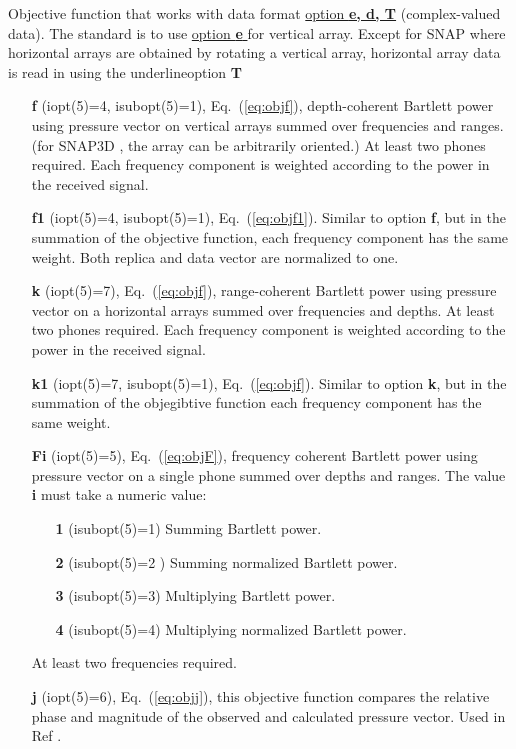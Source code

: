 \documentclass{saclantc}
\begin{document}
Objective function that works with data format \underline{option {\bf
e, d, T}}
(complex-valued data). The standard is to use \underline{option {\bf e
}} for vertical array. 
Except for {\sf SNAP} where horizontal arrays are obtained by
rotating a vertical array, horizontal array data is read in using the
underline{option {\bf T }}
\vspace{-0.6cm}
\begin{itemize}
    \item[{\bf f}] (iopt(5)=4, isubopt(5)=1), Eq.\ (\ref{eq:objf}), depth-coherent Bartlett power
 using pressure vector on vertical  arrays summed over frequencies and ranges.
(for {\sf SNAP3D }, the array can be arbitrarily oriented.)
At least two phones required.
Each frequency component  is weighted according to the power in the
received signal.
\vspace{-0.3cm}
    \item[{\bf f1}] (iopt(5)=4, isubopt(5)=1), Eq.\ (\ref{eq:objf1}). Similar to option {\bf f}, but in the summation of the objective function, 
each frequency component has the same weight.  Both replica and data
vector are normalized to one.
 \vspace{-0.3cm}
    \item[{\bf k}] (iopt(5)=7), Eq.\ (\ref{eq:objf}), range-coherent Bartlett power
 using pressure vector on a horizontal  arrays summed over frequencies and depths.
At least two phones required.
Each frequency component is weighted according to the power in the
received signal.
 \vspace{-0.3cm}
    \item[{\bf k1}] (iopt(5)=7, isubopt(5)=1), Eq.\ (\ref{eq:objf}). Similar to option {\bf k}, but in the summation of the objegibtive function 
each frequency component has the same weight.
 \vspace{-0.3cm}
    \item[{\bf Fi}] (iopt(5)=5), Eq.\ (\ref{eq:objF}),   frequency coherent Bartlett power
 using pressure vector on a single phone summed over depths and ranges.
The value {\bf i} must take a numeric value:
\begin{itemize}
 \item[{\bf 1}] (isubopt(5)=1)  Summing Bartlett power.
 \item[{\bf 2}] (isubopt(5)=2 ) Summing normalized Bartlett power.
 \item[{\bf 3}] (isubopt(5)=3)  Multiplying Bartlett power.
 \item[{\bf 4}] (isubopt(5)=4)  Multiplying normalized Bartlett power.
\end{itemize}
At least two frequencies required.
\vspace{-0.3cm}
    \item[{\bf j}] (iopt(5)=6), Eq.\ (\ref{eq:objj}), this objective function compares the
    relative phase
and magnitude of the observed and calculated pressure vector. Used in Ref 
\cite{gerstoft:ieee00}.
\vspace{+0.3cm}
\end{itemize}
\end{document}
